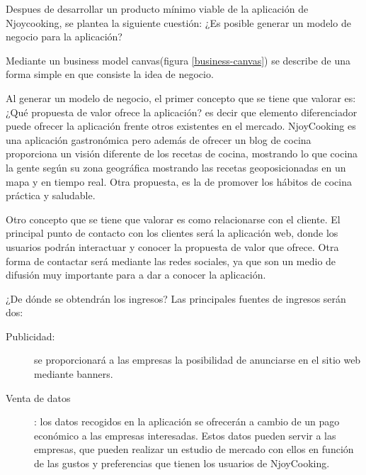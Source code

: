 Despues de desarrollar un producto mínimo viable de la aplicación de Njoycooking, se plantea la siguiente cuestión: ¿Es posible generar un modelo de negocio para la aplicación?

Mediante un business model canvas(figura \ref{business-canvas}) se describe de una forma simple en que consiste la idea de negocio.

\vspace{5 mm}

Al generar un modelo de negocio, el primer concepto que se tiene que valorar es: ¿Qué propuesta de valor ofrece la aplicación? es decir que elemento
diferenciador puede ofrecer la aplicación frente otros existentes en el mercado. NjoyCooking es una aplicación gastronómica pero además de ofrecer un
blog de cocina proporciona un visión diferente de los recetas de cocina, mostrando lo que cocina la gente según su zona geográfica mostrando las recetas
geoposicionadas en un mapa y en tiempo real. Otra propuesta, es la de promover los hábitos de cocina práctica y saludable.


\vspace{5 mm}

Otro concepto que se tiene que valorar es como relacionarse con el cliente. El principal punto de contacto con los clientes será la aplicación web,
donde los usuarios podrán interactuar y conocer la propuesta de valor que ofrece. Otra forma de contactar será mediante las redes sociales, ya que son
un medio de difusión muy importante para a dar a conocer la aplicación.

\vspace{5 mm}

¿De dónde se obtendrán los ingresos? Las principales fuentes de ingresos serán dos:

\begin{description}

\item [Publicidad:] se proporcionará a las empresas la posibilidad de anunciarse en el sitio web mediante banners.

\item [Venta de datos]: los datos recogidos en la aplicación se ofrecerán a cambio de un pago económico a las empresas interesadas. Estos datos pueden servir a las empresas, que pueden realizar un estudio de mercado con ellos en función de las gustos y preferencias que tienen los usuarios de NjoyCooking.

\end{description}

